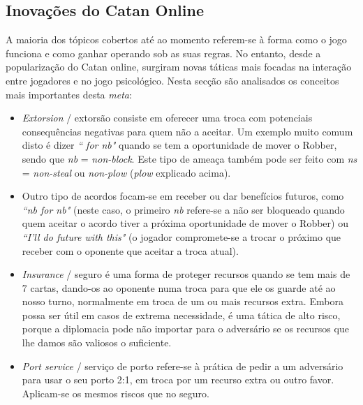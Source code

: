 \documentclass[12pt]{article}
\begin{document}
\subsection{Inovações do Catan Online}
A maioria dos tópicos cobertos até ao momento referem-se à forma como o jogo funciona e como ganhar operando sob as suas regras.
No entanto, desde a popularização do Catan online, surgiram novas táticas mais focadas na interação entre jogadores e no jogo psicológico.
Nesta secção são analisados os conceitos mais importantes desta \textit{meta}:
\vspace{-0.2cm}
\begin{itemize}
    \item \textit{Extorsion} / extorsão consiste em oferecer uma troca com potenciais consequências negativas para quem não a aceitar. 
    Um exemplo muito comum disto é dizer \textit{``  for nb"} quando se tem a oportunidade de mover o Robber, sendo que \textit{nb} = \textit{non-block}. 
    Este tipo de ameaça também pode ser feito com \textit{ns} = \textit{non-steal} ou \textit{non-plow} (\textit{plow} explicado acima).
    \vspace{-0.2cm}
    \item Outro tipo de acordos focam-se em receber ou dar benefícios futuros, como 
    \textit{``nb for nb"} (neste caso, o primeiro \textit{nb} refere-se a não ser bloqueado quando quem aceitar o acordo tiver a próxima oportunidade de mover o Robber) ou 
    \textit{``I'll do future  with this"} (o jogador compromete-se a trocar o próximo  que receber com o oponente que aceitar a troca atual).
    \vspace{-0.2cm}
    \item \textit{Insurance} / seguro é uma forma de proteger recursos quando se tem mais de 7 cartas, dando-os ao oponente numa troca para que ele os guarde até ao nosso turno, normalmente em troca de um ou mais recursos extra.
    Embora possa ser útil em casos de extrema necessidade, é uma tática de alto risco, porque a diplomacia pode não importar para o adversário se os recursos que lhe damos são valiosos o suficiente.
    \vspace{-0.2cm}
    \item \textit{Port service} / serviço de porto refere-se à prática de pedir a um adversário para usar o seu porto 2:1, em troca por um recurso extra ou outro favor. 
    Aplicam-se os mesmos riscos que no seguro.  
\end{itemize}
\end{document}
